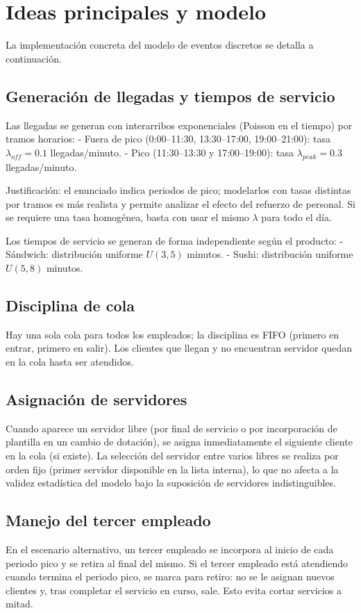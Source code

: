 \documentclass[11pt]{article}
\begin{document}
\section*{Ideas principales y modelo}
La implementación concreta del modelo de eventos discretos se detalla a continuación.

\subsection*{Generación de llegadas y tiempos de servicio}
Las llegadas se generan con interarribos exponenciales (Poisson en el tiempo) por tramos horarios:
- Fuera de pico (0:00--11:30, 13:30--17:00, 19:00--21:00): tasa $\lambda_{off}=0.1$ llegadas/minuto.
- Pico (11:30--13:30 y 17:00--19:00): tasa $\lambda_{peak}=0.3$ llegadas/minuto.

Justificación: el enunciado indica periodos de pico; modelarlos con tasas distintas por tramos es más realista y permite analizar el efecto del refuerzo de personal. Si se requiere una tasa homogénea, basta con usar el mismo $\lambda$ para todo el día.

Los tiempos de servicio se generan de forma independiente según el producto:
- Sándwich: distribución uniforme $U(3,5)$ minutos.
- Sushi: distribución uniforme $U(5,8)$ minutos.

\subsection*{Disciplina de cola}
Hay una sola cola para todos los empleados; la disciplina es FIFO (primero en entrar, primero en salir). Los clientes que llegan y no encuentran servidor quedan en la cola hasta ser atendidos.

\subsection*{Asignación de servidores}
Cuando aparece un servidor libre (por final de servicio o por incorporación de plantilla en un cambio de dotación), se asigna inmediatamente el siguiente cliente en la cola (si existe). La selección del servidor entre varios libres se realiza por orden fijo (primer servidor disponible en la lista interna), lo que no afecta a la validez estadística del modelo bajo la suposición de servidores indistinguibles.

\subsection*{Manejo del tercer empleado}
En el escenario alternativo, un tercer empleado se incorpora al inicio de cada periodo pico y se retira al final del mismo. Si el tercer empleado está atendiendo cuando termina el periodo pico, se marca para retiro: no se le asignan nuevos clientes y, tras completar el servicio en curso, sale. Esto evita cortar servicios a mitad.
\end{document}
